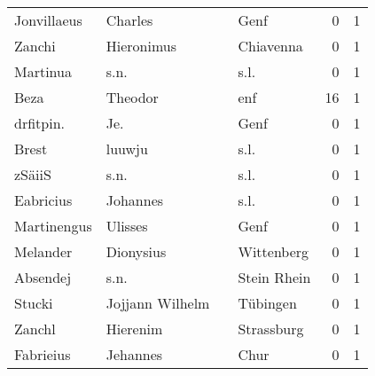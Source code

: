 \documentclass[10pt,a4paper,landscape]{article}
\begin{document}
\begin{longtable}{llllrr}
              Jonvillaeus &                            Charles &             &                                        Genf &          0 &         1 \\
                   Zanchi &                         Hieronimus &             &                                   Chiavenna &          0 &         1 \\
                 Martinua &                               s.n. &             &                                        s.l. &          0 &         1 \\
                     Beza &                            Theodor &             &                                         enf &         16 &         1 \\
                drfitpin. &                                Je. &             &                                        Genf &          0 &         1 \\
                    Brest &                             luuwju &             &                                        s.l. &          0 &         1 \\
                   zSäiiS &                               s.n. &             &                                        s.l. &          0 &         1 \\
                Eabricius &                           Johannes &             &                                        s.l. &          0 &         1 \\
              Martinengus &                            Ulisses &             &                                        Genf &          0 &         1 \\
                 Melander &                          Dionysius &             &                                  Wittenberg &          0 &         1 \\
                 Absendej &                               s.n. &             &                                 Stein Rhein &          0 &         1 \\
                   Stucki &                    Jojjann Wilhelm &             &                                    Tübingen &          0 &         1 \\
                   Zanchl &                           Hierenim &             &                                  Strassburg &          0 &         1 \\
                Fabrieius &                           Jehannes &             &                                        Chur &          0 &         1 \\

\end{longtable}
\end{document}
